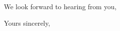 \documentclass[11pt]{letter}
\begin{document}
\begin{letter}{}
We look forward to hearing from you,

\closing{Yours sincerely,}









\end{letter}
\end{document}
